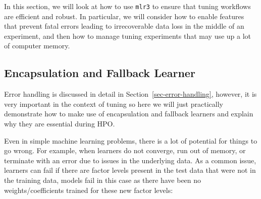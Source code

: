 In this section, we will look at how to use \texttt{mlr3} to ensure that
tuning workflows are efficient and robust. In particular, we will
consider how to enable features that prevent fatal errors leading to
irrecoverable data loss in the middle of an experiment, and then how to
manage tuning experiments that may use up a lot of computer memory.

\hypertarget{sec-encapsulation-fallback}{%
\subsection{Encapsulation and Fallback
Learner}\label{sec-encapsulation-fallback}}

Error handling is discussed in detail in
Section~\ref{sec-error-handling}, however, it is very important in the
context of tuning so here we will just practically demonstrate how to
make use of encapsulation and fallback learners and explain why they are
essential during HPO.

Even in simple machine learning problems, there is a lot of potential
for things to go wrong. For example, when learners do not converge, run
out of memory, or terminate with an error due to issues in the
underlying data. As a common issue, learners can fail if there are
factor levels present in the test data that were not in the training
data, models fail in this case as there have been no
weights/coefficients trained for these new factor levels:

